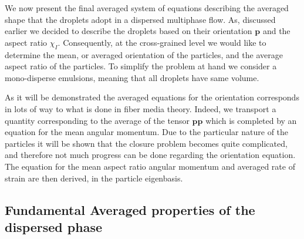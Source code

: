 
We now present the final averaged system of equations describing the averaged shape that the droplets adopt in a dispersed multiphase flow. 
As, discussed earlier we decided to describe the droplets based on their orientation $\textbf{p}$ and the aspect ratio $\chi_I$.
Consequently, at the cross-grained level we would like to determine the mean, or averaged orientation of the particles, and the average aspect ratio of the particles.  
To simplify the problem at hand we consider a mono-disperse emulsions, meaning that all droplets have same volume. 

As it will be demonstrated the averaged equations for the orientation corresponds in lots of way to what is done in fiber media theory. 
Indeed, we transport a quantity corresponding to the average of the tensor $\textbf{pp}$ which is completed by an equation for the mean angular momentum. 
Due to the particular nature of the particles it will be shown that the closure problem becomes quite complicated, and therefore not much progress can be done regarding the orientation equation. 
The equation for the mean aspect ratio angular momentum and averaged rate of strain are then derived, in the particle eigenbasis.





\subsection{Fundamental Averaged properties of the dispersed phase} 

